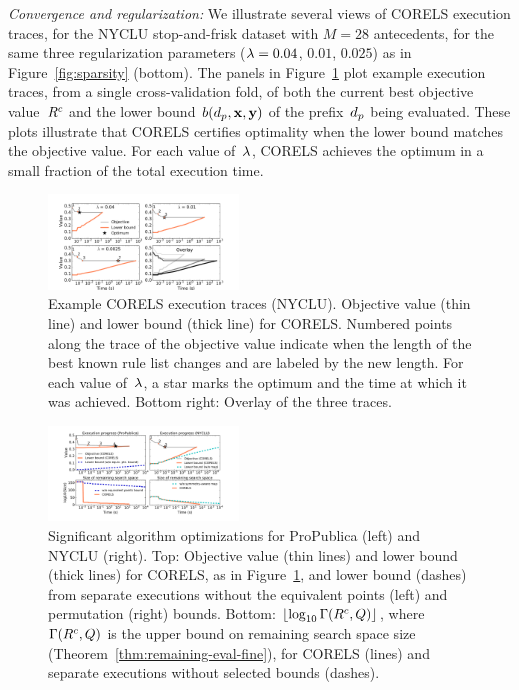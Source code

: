 \textit{Convergence and regularization:}
We illustrate several views of CORELS execution traces,
for the NYCLU stop-and-frisk dataset with ${M = 28}$ antecedents,
for the same three regularization parameters (${{\lambda} = 0.04}$, $0.01$, $0.025$)
as in Figure~\ref{fig:sparsity} (bottom).
%
The panels in Figure~\ref{fig:weapon-reg-execution} plot example execution traces,
from a single cross-validation fold, of both the current best objective value~${R^c}$
and the lower bound~$b(d_p, \mathbf{x}, \mathbf{y})$ of the prefix~$d_p$ being evaluated.
%
These plots illustrate that CORELS certifies optimality
when the lower bound matches the objective value.
%
For each value of~${\lambda}$, CORELS achieves the optimum in a small fraction of the total execution time.

\begin{figure}[t!]
\begin{center}
\includegraphics[trim={25mm 10mm 35mm 10mm},
width=0.45\textwidth]{figs/weapon_reg_small-execution.pdf}
\end{center}
\caption{Example CORELS execution traces (NYCLU).
%
Objective value (thin line) and lower bound (thick line) for CORELS.
%
Numbered points along the trace of the objective value
indicate when the length of the best known rule list changes
and are labeled by the new length.
%
For each value of~${\lambda}$, a star marks the optimum
and the time at which it was achieved.
%
Bottom right: Overlay of the three traces.
}
\label{fig:weapon-reg-execution}
\end{figure}

\begin{figure}[t!]
\begin{center}
\includegraphics[trim={30mm 15mm 35mm 5mm}, width=0.45\textwidth]{figs/weapon_execution-remaining-space.pdf}
\end{center}
\caption{Significant algorithm optimizations
for ProPublica (left) and NYCLU (right).
%
Top: Objective value (thin lines) and lower bound (thick lines) for CORELS,
as in Figure~\ref{fig:weapon-reg-execution},
and lower bound (dashes) from separate executions without
the equivalent points (left) and permutation (right) bounds.
%
Bottom: $\lfloor \log_{10} \Gamma({R^c}, Q) \rfloor$,
where~$\Gamma({R^c}, Q)$
is the upper bound on remaining search space size
(Theorem~\ref{thm:remaining-eval-fine}),
for CORELS (lines) and separate executions without selected bounds (dashes).
}
\label{fig:objective}
\end{figure}

